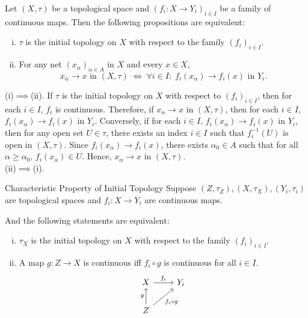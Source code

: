 \documentclass{report}
\begin{document}
\begin{proposition}{}{}
	Let $(X,\tau)$ be a topological space and $\left(f_i: X \to Y_i\right)_{i \in I}$ be a family of continuous maps. Then the following propositions are equivalent:
	\begin{enumerate}[(i)]
		\item $\tau$ is the initial topology on $X$ with respect to the family $\left(f_i\right)_{i \in I}$.
		\item For any net $\left(x_\alpha\right)_{\alpha \in A}$ in $X$ and every $x\in X$,
		\[
		x_\alpha\longrightarrow x\text{ in }(X,\tau)
		\;\Longleftrightarrow\;
		\forall i\in I:\; f_i(x_\alpha)\longrightarrow f_i(x)\text{ in }Y_i .
		\]
	\end{enumerate}
\end{proposition}
\begin{prf}
	(i)$\implies$(ii). If $\tau$ is the initial topology on $X$ with respect to $\left(f_i\right)_{i \in I}$, then for each $i\in I$, $f_i$ is continuous. Therefore, if $x_\alpha\longrightarrow x$ in $(X,\tau)$, then for each $i\in I$, $f_i(x_\alpha)\longrightarrow f_i(x)$ in $Y_i$. Conversely, if for each $i\in I$, $f_i(x_\alpha)\longrightarrow f_i(x)$ in $Y_i$, then for any open set $U\in \tau$, there exists an index $i\in I$ such that $f_i^{-1}(U)$ is open in $(X,\tau)$. Since $f_i(x_\alpha)\longrightarrow f_i(x)$, there exists $\alpha_0\in A$ such that for all $\alpha\geq \alpha_0$, $f_i(x_\alpha)\in U$. Hence, $x_\alpha\longrightarrow x$ in $(X,\tau)$.\\
	(ii)$\implies$(i). 
\end{prf}

\begin{proposition}{Characteristic Property of Initial Topology}{}
	Suppose $(Z,\tau_Z), (X,\tau_X),(Y_i,\tau_i)$ are topological spaces and $f_i: X \to Y_i$ are continuous maps. 
	
	And the following statements are equivalent:
	\begin{enumerate}[(i)]
		\item $\tau_X$ is the initial topology on $X$ with respect to the family $\left(f_i\right)_{i \in I}$.
		\item A map $g:Z\to X$ is continuous iff $f_i\circ g$ is continuous for all $i \in I$. 
		\[
			\begin{tikzcd}
				X \arrow[r, "f_i"]                         & Y_i \\
				Z \arrow[u, "g"] \arrow[ru, "f_i\circ g"'] &    
			\end{tikzcd}
		\]
	\end{enumerate}
\end{proposition}
\end{document}
